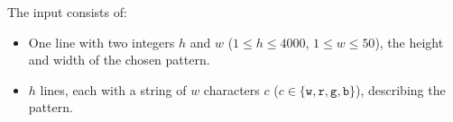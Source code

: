 
    The input consists of:
    \begin{itemize}
        \item One line with two integers $h$ and $w$ ($1 \leq h \leq 4000$, $1 \leq w \leq 50$),
            the height and width of the chosen pattern.
        \item $h$ lines, each with a string of $w$ characters $c$ ($c \in \{\texttt{w}, \texttt{r}, \texttt{g}, \texttt{b}\}$),
            describing the pattern.
    \end{itemize}
